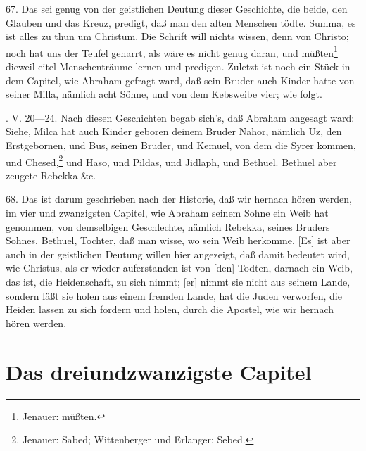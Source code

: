 67. Das sei genug von der geistlichen Deutung dieser Geschichte, die beide, den Glauben und das Kreuz, predigt, daß man den alten Menschen tödte. Summa, es ist alles zu thun um Christum. Die Schrift will nichts wissen, denn von Christo; noch hat uns der Teufel genarrt, als wäre es nicht genug daran, und müßten\footnote{Jenauer: müßten.} dieweil eitel Menschenträume lernen und predigen. Zuletzt ist noch ein Stück in dem Capitel, wie Abraham gefragt ward, daß sein Bruder auch Kinder hatte von seiner Milla, nämlich acht Söhne, und von dem Kebsweibe vier; wie folgt.

. V. 20—24. Nach diesen Geschichten begab sich’s, daß Abraham angesagt ward: Siehe, Milca hat auch Kinder geboren deinem Bruder Nahor, nämlich Uz, den Erstgebornen, und Bus, seinen Bruder, und Kemuel, von dem die Syrer kommen, und Chesed,\footnote{Jenauer: Sabed; Wittenberger und Erlanger: Sebed.} und Haso, und Pildas, und Jidlaph, und Bethuel. Bethuel aber zeugete Rebekka \&c.

68. Das ist darum geschrieben nach der Historie, daß wir hernach hören werden, im vier und zwanzigsten Capitel, wie Abraham seinem Sohne ein Weib hat genommen, von demselbigen Geschlechte, nämlich Rebekka, seines Bruders Sohnes, Bethuel, Tochter, daß man wisse, wo sein Weib herkomme. [Es] ist aber auch in der geistlichen Deutung willen hier angezeigt, daß damit bedeutet wird, wie Christus, als er wieder auferstanden ist von [den] Todten, darnach ein Weib, das ist, die Heidenschaft, zu sich nimmt; [er] nimmt sie nicht aus seinem Lande, sondern läßt sie holen aus einem fremden Lande, hat die Juden verworfen, die Heiden lassen zu sich fordern und holen, durch die Apostel, wie wir hernach hören werden.

\section{Das dreiundzwanzigste Capitel}

